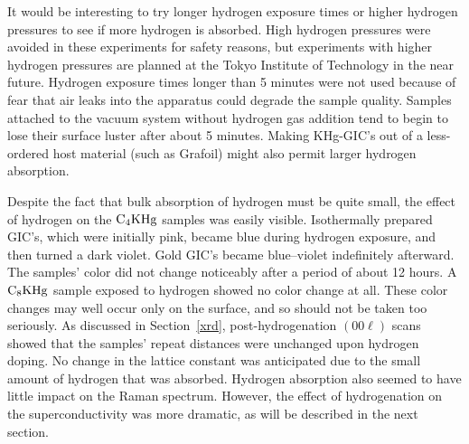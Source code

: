         It would be interesting to   try longer hydrogen exposure times  or
higher hydrogen  pressures  to see  if  more hydrogen is   absorbed.   High
hydrogen pressures were  avoided in these  experiments for safety  reasons,
but  experiments with higher hydrogen pressures  are planned  at the  Tokyo
Institute of Technology in the near future.\cite{enoki88} Hydrogen exposure
times longer than 5 minutes  were not used because  of  fear that air leaks
into the apparatus could  degrade the  sample quality.  Samples attached to the
vacuum system  without hydrogen gas addition tend  to  begin to  lose their
surface  luster   after  about 5   minutes.  Making    KHg-GIC's out of   a
less-ordered host material  (such   as  Grafoil) might also permit   larger
hydrogen absorption.\cite{guerard83}

        Despite the  fact that bulk absorption  of   hydrogen must be quite
small, the  effect of  hydrogen on  the $\rm   C_4KHg$ samples   was easily
visible.   Isothermally prepared  GIC's,  which were initially pink, became
blue during hydrogen exposure,  and then turned  a dark violet.  Gold GIC's
became blue--violet  indefinitely  afterward.  The samples'  color did  not
change noticeably after a period of about 12 hours.  A $\rm  C_8KHg$ sample
exposed to hydrogen showed no color change at all.  These color changes may
well occur only on the surface,  and so should not  be taken too seriously.
As  discussed in  Section~\ref{xrd},  post-hydrogenation $(00\ell )$  scans
showed that the samples'  repeat distances  were  unchanged   upon hydrogen
doping.  No change in the lattice constant was anticipated due to the small
amount of hydrogen that  was absorbed.  Hydrogen  absorption also seemed to
have   little  impact   on the  Raman  spectrum.  However,   the  effect of
hydrogenation on  the  superconductivity was more   dramatic,  as   will be
described in the next section.



